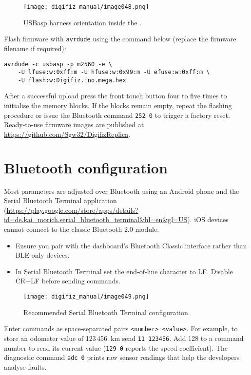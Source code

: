 \begin{figure}[htbp]
    \centering
    \texttt{[image: digifiz\_manual/image048.png]}
    \caption{USBasp harness orientation inside the \ReplicaGenOne{}.}
    \label{fig:usbasp-cable}
\end{figure}

Flash firmware with \texttt{avrdude} using the command below (replace the firmware filename if required):

\begin{verbatim}
avrdude -c usbasp -p m2560 -e \
    -U lfuse:w:0xff:m -U hfuse:w:0x99:m -U efuse:w:0xff:m \
    -U flash:w:Digifiz.ino.mega.hex
\end{verbatim}

After a successful upload press the front touch button four to five times to initialise the memory blocks. If the blocks remain empty, repeat the flashing procedure or issue the Bluetooth command \verb|252 0| to trigger a factory reset. Ready-to-use firmware images are published at \url{https://github.com/Sgw32/DigifizReplica}.

\section{Bluetooth configuration}
Most parameters are adjusted over Bluetooth using an Android phone and the Serial Bluetooth Terminal application (\url{https://play.google.com/store/apps/details?id=de.kai_morich.serial_bluetooth_terminal&hl=en&gl=US}). iOS devices cannot connect to the classic Bluetooth 2.0 module.

\begin{itemize}
    \item Ensure you pair with the dashboard's Bluetooth Classic interface rather than BLE-only devices.
    \item In Serial Bluetooth Terminal set the end-of-line character to LF. Disable CR+LF before sending commands.
\end{itemize}

\begin{figure}[htbp]
    \centering
    \texttt{[image: digifiz\_manual/image049.png]}
    \caption{Recommended Serial Bluetooth Terminal configuration.}
    \label{fig:sbt-settings}
\end{figure}

Enter commands as space-separated pairs \verb|<number> <value>|. For example, to store an odometer value of 123\,456~km send \verb|11 123456|. Add 128 to a command number to read its current value (\verb|129 0| reports the speed coefficient). The diagnostic command \verb|adc 0| prints raw sensor readings that help the developers analyse faults.

